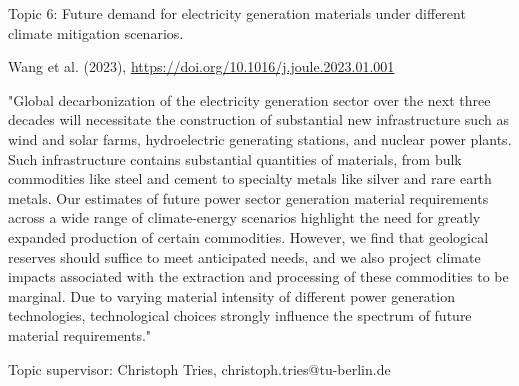 \documentclass[10pt,aspectratio=169,dvipsnames]{beamer}
\begin{document}
\begin{frame}
  \begin{block}{Topic 6:  Future demand for electricity generation materials under different climate mitigation scenarios.}
      
    Wang et al. (2023), 
    \href{https://doi.org/10.1016/j.joule.2023.01.001}{https://doi.org/10.1016/j.joule.2023.01.001}
    
    "Global decarbonization of the electricity generation sector over the next three decades will necessitate the construction of substantial new infrastructure such as wind and solar farms, hydroelectric generating stations, and nuclear power plants. Such infrastructure contains substantial quantities of materials, from bulk commodities like steel and cement to specialty metals like silver and rare earth metals. Our estimates of future power sector generation material requirements across a wide range of climate-energy scenarios highlight the need for greatly expanded production of certain commodities. However, we find that geological reserves should suffice to meet anticipated needs, and we also project climate impacts associated with the extraction and processing of these commodities to be marginal. Due to varying material intensity of different power generation technologies, technological choices strongly influence the spectrum of future material requirements."

    \hfill
    Topic supervisor:  Christoph Tries, christoph.tries@tu-berlin.de
    
  \end{block}
\end{frame}
\end{document}
